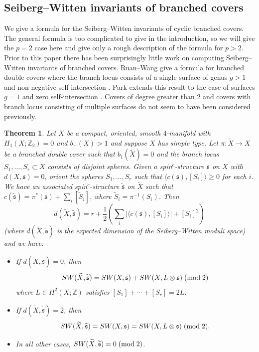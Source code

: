 \documentclass{amsart}
\newtheorem{theorem}{Theorem}[section]
\theoremstyle{definition}
\theoremstyle{remark}
\numberwithin{equation}{section}
\begin{document}
\subsection{Seiberg--Witten invariants of branched covers}

We give a formula for the Seiberg--Witten invariants of cyclic branched covers. The general formula is too complicated to give in the introduction, so we will give the $p=2$ case here and give only a rough description of the formula for $p > 2$. Prior to this paper there has been surprisingly little work on computing Seiberg--Witten invariants of branched covers. Ruan--Wang give a formula for branched double covers where the branch locus consists of a single surface of genus $g > 1$ and non-negative self-intersection \cite{ruwa}. Park extends this result to the case of surfaces $g=1$ and zero self-intersection \cite{park}. Covers of degree greater than $2$ and covers with branch locus consisting of multiple surfaces do not seem to have been considered previously.


\begin{theorem}
Let $X$ be a compact, oriented, smooth $4$-manifold with $H_1(X ; \mathbb{Z}_2) = 0$ and $b_+(X) > 1$ and suppose $X$ has simple type. Let $\pi : \widetilde{X} \to X$ be a branched double cover such that $b_1(\widetilde{X}) = 0$ and the branch locus $S_1, \dots , S_r \subset X$ consists of disjoint spheres. Given a spin$^c$-structure $\mathfrak{s}$ on $X$ with $d(X , \mathfrak{s}) = 0$, orient the spheres $S_1, \dots , S_r$ such that $\langle c(\mathfrak{s}) , [S_i] \rangle \ge 0$ for each $i$. We have an associated spin$^c$-structure $\widetilde{\mathfrak{s}}$ on $\widetilde{X}$ such that $c(\widetilde{\mathfrak{s}}) = \pi^*(\mathfrak{s}) + \sum_i [\widetilde{S}_i]$, where $\widetilde{S}_i = \pi^{-1}(S_i)$. Then
\[
d(\widetilde{X} , \widetilde{\mathfrak{s}} ) = r + \frac{1}{2}\left( \sum_i |\langle c(\mathfrak{s}) , [S_i] \rangle | + [S_i]^2 \right)
\]
(where $d(\widetilde{X} , \widetilde{\mathfrak{s}} )$ is the expected dimension of the Seiberg--Witten moduli space) and we have:
\begin{itemize}
\item[(1)]{If $d(\widetilde{X} , \widetilde{\mathfrak{s}}) = 0$, then 
\[
SW(\widetilde{X} , \widetilde{\mathfrak{s}}) = SW(X , \mathfrak{s}) + SW(X , L \otimes \mathfrak{s}) \; ({\rm mod} \; 2)
\]
where $L \in H^2(X ; \mathbb{Z})$ satisfies $[S_1]+ \cdots + [S_r] = 2L$.}
\item[(2)]{If $d(\widetilde{X} , \widetilde{\mathfrak{s}}) = 2$, then
\[
SW(\widetilde{X} , \widetilde{\mathfrak{s}}) = SW(X , \mathfrak{s}) = SW(X , L \otimes \mathfrak{s}) \; ({\rm mod} \; 2).
\]
}
\item[(3)]{In all other cases, $SW(\widetilde{X} , \widetilde{\mathfrak{s}}) = 0 \; ({\rm mod} \; 2)$.}
\end{itemize}

\end{theorem}
\end{document}
